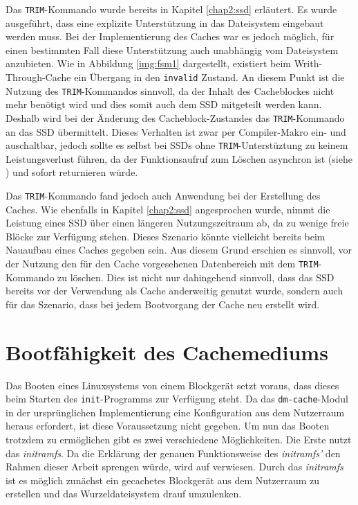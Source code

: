 Das \texttt{TRIM}-Kommando wurde bereits in Kapitel \ref{chap2:ssd} erläutert. Es wurde ausgeführt, dass eine explizite Unterstützung in das Dateisystem
eingebaut werden muss. Bei der Implementierung des Caches war es jedoch möglich, für einen bestimmten Fall diese Unterstützung auch unabhängig vom Dateisystem
anzubieten. Wie in Abbildung \ref{img:fsm1} dargestellt, existiert beim Writh-Through-Cache ein Übergang in den \texttt{invalid} Zustand. An diesem Punkt ist die
Nutzung des \texttt{TRIM}-Kommandos sinnvoll, da der Inhalt des Cacheblockes nicht mehr benötigt wird und dies somit auch dem \ac{SSD} mitgeteilt werden kann.
Deshalb wird bei der Änderung des Cacheblock-Zustandes das \texttt{TRIM}-Kommando an das \ac{SSD} übermittelt. Dieses Verhalten ist zwar per Compiler-Makro ein-
und auschaltbar, jedoch sollte es selbst bei \acp{SSD} ohne \texttt{TRIM}-Unterstüztung zu keinem Leistungsverlust führen, da der Funktionsaufruf zum Löschen
asynchron ist (siehe \cite{linux:trim}) und sofort returnieren würde.

Das \texttt{TRIM}-Kommando fand jedoch auch Anwendung bei der Erstellung des Caches. Wie ebenfalls in Kapitel \ref{chap2:ssd} angesprochen wurde, nimmt die
Leistung eines \ac{SSD} über einen längeren Nutzungszeitraum ab, da zu wenige freie Blöcke zur Verfügung stehen. Dieses Szenario könnte vielleicht bereits beim
Nauaufbau eines Caches gegeben sein. Aus diesem Grund erschien es sinnvoll, vor der Nutzung den für den Cache vorgesehenen Datenbereich mit dem
\texttt{TRIM}-Kommando zu löschen. Dies ist nicht nur dahingehend sinnvoll, dass das \ac{SSD} bereits vor der Verwendung als Cache anderweitig genutzt wurde,
sondern auch für das Szenario, dass bei jedem Bootvorgang der Cache neu erstellt wird.

\section{Bootfähigkeit des Cachemediums}
\label{chap6:boot}

Das Booten eines Linuxsystems von einem Blockgerät setzt voraus, dass dieses beim Starten des \texttt{init}-Programms zur Verfügung steht. Da das
\texttt{dm-cache}-Modul in der ursprünglichen Implementierung eine Konfiguration aus dem Nutzerraum heraus erfordert, ist diese Voraussetzung nicht gegeben. Um
nun das Booten trotzdem zu ermöglichen gibt es zwei verschiedene Möglichkeiten. Die Erste nutzt das \textit{initramfs}. Da die Erklärung der genauen
Funktionsweise des \textit{initramfs'} den Rahmen dieser Arbeit sprengen würde, wird auf \cite{initramfs} verwiesen. Durch das \textit{initramfs} ist es möglich
zunächst ein gecachetes Blockgerät aus dem Nutzerraum zu erstellen und das Wurzeldateisystem drauf umzulenken.

